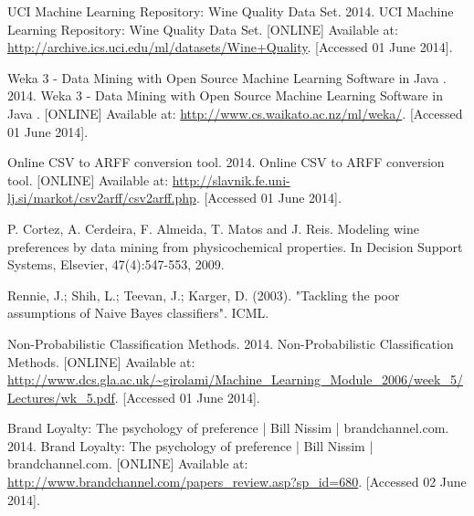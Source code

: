 \documentclass[a4paper,12pt,openany]{report}
\begin{document}
\begin{thebibliography}{10}
	UCI Machine Learning Repository: Wine Quality Data Set. 2014. UCI Machine Learning Repository: Wine Quality Data Set. [ONLINE] Available at: \url{http://archive.ics.uci.edu/ml/datasets/Wine+Quality}. [Accessed 01 June 2014].

	Weka 3 - Data Mining with Open Source Machine Learning Software in Java . 2014. Weka 3 - Data Mining with Open Source Machine Learning Software in Java . [ONLINE] Available at: \url{http://www.cs.waikato.ac.nz/ml/weka/}. [Accessed 01 June 2014].

	Online CSV to ARFF conversion tool. 2014. Online CSV to ARFF conversion tool. [ONLINE] Available at: \url{http://slavnik.fe.uni-lj.si/markot/csv2arff/csv2arff.php}. [Accessed 01 June 2014].

	P. Cortez, A. Cerdeira, F. Almeida, T. Matos and J. Reis. Modeling wine preferences by data mining from physicochemical properties. In Decision Support Systems, Elsevier, 47(4):547-553, 2009.

	Rennie, J.; Shih, L.; Teevan, J.; Karger, D. (2003). "Tackling the poor assumptions of Naive Bayes classifiers". ICML.

	Non-Probabilistic Classiﬁcation Methods. 2014. Non-Probabilistic Classiﬁcation Methods. [ONLINE] Available at: \url{http://www.dcs.gla.ac.uk/~girolami/Machine_Learning_Module_2006/week_5/Lectures/wk_5.pdf}. [Accessed 01 June 2014].

	Brand Loyalty: The psychology of preference | Bill Nissim | brandchannel.com. 2014. Brand Loyalty: The psychology of preference | Bill Nissim | brandchannel.com. [ONLINE] Available at: \url{http://www.brandchannel.com/papers_review.asp?sp_id=680}. [Accessed 02 June 2014].

\end{thebibliography}
\end{document}
